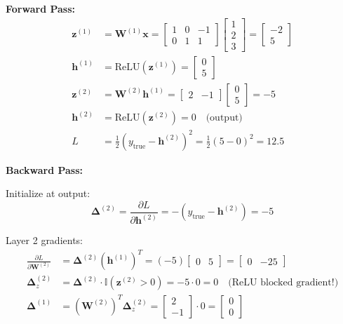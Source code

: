 \begin{notechapter}
\textbf{Forward Pass:}
\begin{align*}
\mathbf{z}^{(1)} &= \mathbf{W}^{(1)} \mathbf{x} = \begin{bmatrix} 1 & 0 & -1 \\ 0 & 1 & 1 \end{bmatrix} \begin{bmatrix} 1 \\ 2 \\ 3 \end{bmatrix} = \begin{bmatrix} -2 \\ 5 \end{bmatrix}\\[0.5em]
\mathbf{h}^{(1)} &= \text{ReLU}(\mathbf{z}^{(1)}) = \begin{bmatrix} 0 \\ 5 \end{bmatrix}\\[0.5em]
\mathbf{z}^{(2)} &= \mathbf{W}^{(2)} \mathbf{h}^{(1)} = \begin{bmatrix} 2 & -1 \end{bmatrix} \begin{bmatrix} 0 \\ 5 \end{bmatrix} = -5\\[0.5em]
\mathbf{h}^{(2)} &= \text{ReLU}(\mathbf{z}^{(2)}) = 0 \quad \text{(output)}\\[0.5em]
L &= \frac{1}{2}(y_{\text{true}} - \mathbf{h}^{(2)})^2 = \frac{1}{2}(5 - 0)^2 = 12.5
\end{align*}

\textbf{Backward Pass:}

Initialize at output:
$$\boldsymbol{\Delta}^{(2)} = \frac{\partial L}{\partial \mathbf{h}^{(2)}} = -(y_{\text{true}} - \mathbf{h}^{(2)}) = -5$$

Layer 2 gradients:
\begin{align*}
\frac{\partial L}{\partial \mathbf{W}^{(2)}} &= \boldsymbol{\Delta}^{(2)} (\mathbf{h}^{(1)})^T = (-5) \begin{bmatrix} 0 & 5 \end{bmatrix} = \begin{bmatrix} 0 & -25 \end{bmatrix}\\[0.5em]
\boldsymbol{\Delta}_z^{(2)} &= \boldsymbol{\Delta}^{(2)} \cdot \mathbb{I}(\mathbf{z}^{(2)} > 0) = -5 \cdot 0 = 0 \quad \text{(ReLU blocked gradient!)}\\[0.5em]
\boldsymbol{\Delta}^{(1)} &= (\mathbf{W}^{(2)})^T \boldsymbol{\Delta}_z^{(2)} = \begin{bmatrix} 2 \\ -1 \end{bmatrix} \cdot 0 = \begin{bmatrix} 0 \\ 0 \end{bmatrix}
\end{align*}


\end{notechapter}
